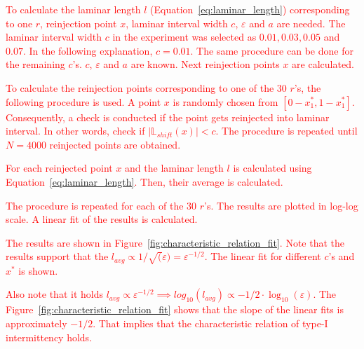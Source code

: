 \par
\textcolor{red}{
To calculate the laminar length $l$ (Equation~\eqref{eq:laminar_length}) corresponding to one $r$, reinjection point $x$, laminar interval width $c$, $\varepsilon$ and $a$ are needed.
The laminar interval width $c$ in the experiment was selected as $0.01, 0.03, 0.05$ and $0.07$.
In the following explanation, $c = 0.01$.
The same procedure can be done for the remaining $c$'s.
$c$, $\varepsilon$ and $a$ are known.
Next reinjection points $x$ are calculated.
}
\par
\textcolor{red}{
To calculate the reinjection points corresponding to one of the $30$ $r$'s, the following procedure is used.
A point $x$ is randomly chosen from $[ 0-x^{*}_{1}, 1-x^{*}_{1} ]$.
Consequently, a check is conducted if the point gets reinjected into laminar interval.
In other words, check if $| \mathbb{L}_{shift}(x) | < c$.
The procedure is repeated until $N = 4000$ reinjected points are obtained.
}
\par
\textcolor{red}{
For each reinjected point $x$ and the laminar length $l$ is calculated using Equation~\eqref{eq:laminar_length}.
Then, their average is calculated.
}
\par
\textcolor{red}{
The procedure is repeated for each of the $30$ $r$'s.
The results are plotted in log-log scale.
A linear fit of the results is calculated.
}
\par
\textcolor{red}{
The results are shown in Figure~\ref{fig:characteristic_relation_fit}.
Note that the results support that the $l_{avg} \propto 1/\sqrt(\varepsilon) = \varepsilon ^ {-1/2}$.
The linear fit for different $c$'s and $x^{*}$ is shown.
}
\par
\textcolor{red}{
Also note that it holds $l_{avg} \propto \varepsilon ^ {-1/2} \implies log_{10}(l_{avg}) \propto -1/2 \cdot \log_{10}(\varepsilon)$.
The Figure~\ref{fig:characteristic_relation_fit} shows that the slope of the linear fits is approximately $-1/2$.
That implies that the characteristic relation of type-I intermittency holds. 
}


